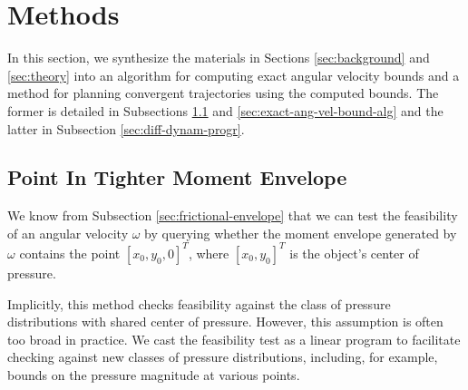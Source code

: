 \documentclass[conference]{IEEEtran}
\begin{document}
\section{Methods}\label{sec:methods}

In this section, we synthesize the materials in Sections
\ref{sec:background} and \ref{sec:theory} into an algorithm for
computing exact angular velocity bounds and a method for planning
convergent trajectories using the computed bounds. The former is
detailed in Subsections \ref{sec:point-in-moment-enve} and
\ref{sec:exact-ang-vel-bound-alg} and the latter in Subsection
\ref{sec:diff-dynam-progr}.



\subsection{Point In Tighter Moment
  Envelope}\label{sec:point-in-moment-enve}

We know from Subsection \ref{sec:frictional-envelope} that we can test
the feasibility of an angular velocity $\omega$ by querying whether
the moment envelope generated by $\omega$ contains the point
$[x_0,y_0,0]^T$, where $[x_0,y_0]^T$ is the object's center of
pressure. 

Implicitly, this method checks feasibility against the class of
pressure distributions with shared center of pressure. However, this
assumption is often too broad in practice. We cast the feasibility
test as a linear program to facilitate checking against new classes of
pressure distributions, including, for example, bounds on the pressure
magnitude at various points.
\end{document}

